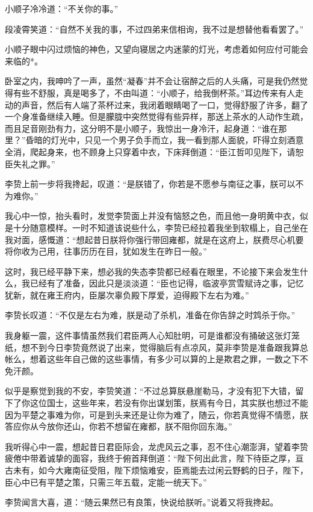 小顺子冷冷道：“不关你的事。”

段凌霄笑道：“自然不关我的事，不过四弟来信相询，我不过是想替他看看罢了。”

小顺子眼中闪过烦恼的神色，又望向寝居之内迷蒙的灯光，考虑着如何应付可能会来临的*。

卧室之内，我呻吟了一声，虽然“凝春”并不会让宿醉之后的人头痛，可是我仍然觉得有些不舒服，真是喝多了，不由叫道：“小顺子，给我倒杯茶。”耳边传来有人走动的声音，然后有人端了茶杯过来，我闭着眼睛喝了一口，觉得舒服了许多，翻了一个身准备继续入睡。但是朦胧中突然觉得有些异样，那送上茶水的人动作生疏，而且足音刚劲有力，这分明不是小顺子，我惊出一身冷汗，起身道：“谁在那里？”昏暗的灯光中，只见一个男子负手而立，我一看到那人面貌，吓得立刻酒意全消，爬起身来，也不顾身上只穿着中衣，下床拜倒道：“臣江哲叩见陛下，请恕臣失礼之罪。”

李贽上前一步将我搀起，叹道：“是朕错了，你若是不愿参与南征之事，朕可以不为难你。”

我心中一惊，抬头看时，发觉李贽面上并没有恼怒之色，而且他一身明黄中衣，似是十分随意模样。一时不知道该说些什么，李贽已经拉着我坐到软榻上，自己坐在我对面，感慨道：“想起昔日朕将你强行带回雍都，就是在这府上，朕费尽心机要将你收为己用，往事历历在目，犹如发生在昨日一般。”

这时，我已经平静下来，想必我的失态李贽都已经看在眼里，不论接下来会发生什么，我已经有了准备，因此只是淡淡道：“臣也记得，临波亭赏雪赋诗之事，记忆犹新，就在雍王府内，臣屡次辜负殿下厚爱，迫得殿下左右为难。”

李贽长叹道：“不仅是左右为难，朕是动了杀机，准备在你告辞之时鸩杀于你。”

我身躯一震，这件事情虽然我们君臣两人心知肚明，可是谁都没有捅破这张灯笼纸，想不到今日李贽竟然说了出来，觉得脑后有点凉风，莫非李贽是准备跟我算总帐么，想着这些年自己做的这些事情，有多少可以算的上是欺君之罪，一数之下不免汗颜。

似乎是察觉到我的不安，李贽笑道：“不过总算朕悬崖勒马，才没有犯下大错，留下了你这位国士，这些年来，若没有你出谋划策，朕焉有今日，其实朕也想过不能因为平楚之事难为你，可是到头来还是让你为难了，随云，你若真觉得不情愿，朕答应你从今放你还山，你若不想留在雍都，朕不阻你回东海。”

我听得心中一震，想起昔日君臣际会，龙虎风云之事，忍不住心潮澎湃，望着李贽疲倦中带着诚挚的面容，我终于俯首拜倒道：“陛下何出此言，陛下待臣之厚，亘古未有，如今大雍南征受阻，陛下烦恼难安，臣焉能去过闲云野鹤的日子，陛下，臣心中已有平楚之策，只需三年五载，定能一统天下。”

李贽闻言大喜，道：“随云果然已有良策，快说给朕听。”说着又将我搀起。

